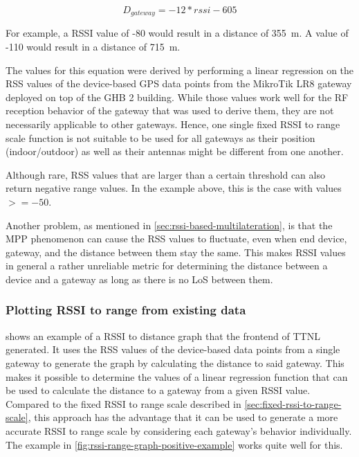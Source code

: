 \begin{equation}\label{eq:fixed-rssi-to-range-scale}
    D_{gateway} = -12 * rssi - 605
\end{equation}

For example, a \ac{RSSI} value of -80 would result in a distance of \SI{355}{\meter}.
A value of -110 would result in a distance of \SI{715}{\meter}.

The values for this equation were derived by performing a linear regression on the \ac{RSS} values of the device-based GPS data points from the MikroTik LR8 gateway deployed on top of the \ac{GHB} 2 building.
While those values work well for the \ac{RF} reception behavior of the gateway that was used to derive them, they are not necessarily applicable to other gateways.
Hence, one single fixed \ac{RSSI} to range scale function is not suitable to be used for all gateways as their position (indoor/outdoor) as well as their antennas might be different from one another.

Although rare, \ac{RSS} values that are larger than a certain threshold can also return negative range values.
In the example above, this is the case with values $>= -50$.

Another problem, as mentioned in \cref{sec:rssi-based-multilateration}, is that the \ac{MPP} phenomenon can cause the \ac{RSS} values to fluctuate, even when end device, gateway, and the distance between them stay the same.
This makes RSSI values in general a rather unreliable metric for determining the distance between a device and a gateway as long as there is no \ac{LoS} between them.

\subsubsection{Plotting \acs{RSSI} to range from existing data}\label{sec:plotting-rssi-to-range-from-existing-data}

 shows an example of a \ac{RSSI} to distance graph that the frontend of \ac{TTNL} generated.
It uses the \ac{RSS} values of the device-based data points from a single gateway to generate the graph by calculating the distance to said gateway.
This makes it possible to determine the values of a linear regression function that can be used to calculate the distance to a gateway from a given \ac{RSSI} value.
Compared to the fixed \ac{RSSI} to range scale described in \cref{sec:fixed-rssi-to-range-scale}, this approach has the advantage that it can be used to generate a more accurate \ac{RSSI} to range scale by considering each gateway's behavior individually.
The example in \cref{fig:rssi-range-graph-positive-example} works quite well for this.

